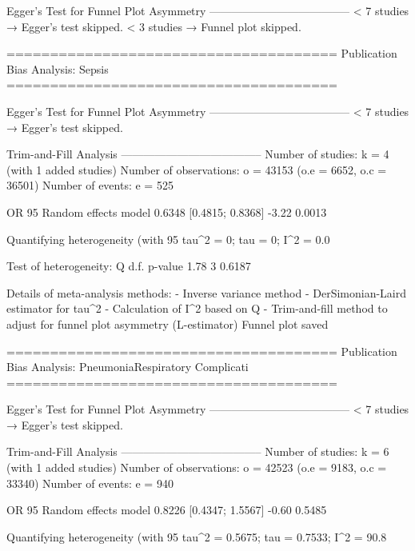 Egger's Test for Funnel Plot Asymmetry
--------------------------------------
  < 7 studies → Egger’s test skipped.
  < 3 studies → Funnel plot skipped.

======================================
Publication Bias Analysis: Sepsis 
======================================
                                                                                                                                                        
Egger's Test for Funnel Plot Asymmetry
--------------------------------------
  < 7 studies → Egger’s test skipped.

Trim-and-Fill Analysis
--------------------------------------
Number of studies: k = 4 (with 1 added studies)
Number of observations: o = 43153 (o.e = 6652, o.c = 36501)
Number of events: e = 525

                         OR           95%
Random effects model 0.6348 [0.4815; 0.8368] -3.22  0.0013

Quantifying heterogeneity (with 95%
 tau^2 = 0; tau = 0; I^2 = 0.0%

Test of heterogeneity:
    Q d.f. p-value
 1.78    3  0.6187

Details of meta-analysis methods:
- Inverse variance method
- DerSimonian-Laird estimator for tau^2
- Calculation of I^2 based on Q
- Trim-and-fill method to adjust for funnel plot asymmetry (L-estimator)
  Funnel plot saved

======================================
Publication Bias Analysis: PneumoniaRespiratory Complicati 
======================================
                                                                                                                                                        
Egger's Test for Funnel Plot Asymmetry
--------------------------------------
  < 7 studies → Egger’s test skipped.

Trim-and-Fill Analysis
--------------------------------------
Number of studies: k = 6 (with 1 added studies)
Number of observations: o = 42523 (o.e = 9183, o.c = 33340)
Number of events: e = 940

                         OR           95%
Random effects model 0.8226 [0.4347; 1.5567] -0.60  0.5485

Quantifying heterogeneity (with 95%
 tau^2 = 0.5675; tau = 0.7533; I^2 = 90.8%

